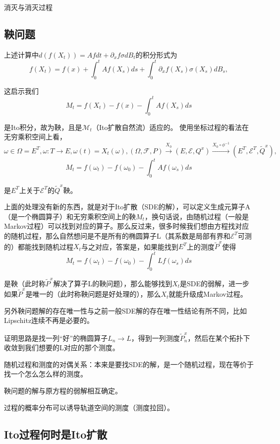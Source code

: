 消灭与消灭过程

\subsection{鞅问题}

上述计算中$d(f(X_t)) = Af dt + \partial_x f \sigma dB_t$的积分形式为
\[
  f(X_t) = f(x) + \int_0^t Af(X_s) ds + \int_0^t \partial_x f(X_s) \sigma(X_s) dB_s,
\]

这启示我们
\[
  M_t = f(X_t) - f(x) - \int_0^t Af(X_s) ds
\]

是Ito积分，故为鞅，且是$\mathcal{M}_t$（Ito扩散自然流）适应的。
使用坐标过程的看法在无穷乘积空间上看，$\omega \in \Omega = E^T, \omega: T \to E, \omega(t) = X_t(\omega), (\Omega, \mathcal{F}, P) \overset{X_0}{\to} (E, \mathcal{E}, Q^x) \overset{X_0 \circ \phi^{-1}}{\longrightarrow} (E^T, \mathcal{E}^T, \widetilde{Q}^x),$
\[
  M_t = f(\omega_t) - f(\omega_0) - \int_0^t Af(\omega_s) ds
\]

是$E^T$上关于$\mathcal{E}^T$的$\widetilde{Q}^x$鞅。

上面的处理没有新的东西，就是对于Ito扩散（SDE的解），可以定义生成元算子A（是一个椭圆算子）和无穷乘积空间上的鞅$M_t$，换句话说，由随机过程（一般是Markov过程）可以找到对应的算子。那么反过来，很多时候我们想由方程找对应的随机过程，那么自然想问是不是所有的椭圆算子L（其系数是局部有界和$\mathcal{E}^T$可测的）都能找到随机过程$X_t$与之对应，答案是，如果能找到$E^T$上的测度$\widetilde{P}^x$使得
\[
  M_t = f(\omega_t) - f(\omega_0) - \int_0^t Lf(\omega_s) ds
\]

是鞅（此时称$\widetilde{P}^x$解决了算子L的鞅问题），那么能够找到$X_t$是SDE的弱解，进一步如果$\widetilde{P}^x$是唯一的（此时称鞅问题是好处理的），那么$X_t$就能升级成Markov过程。

另外鞅问题解的存在唯一性与之前一般SDE解的存在唯一性结论有所不同，比如Lipschitz连续不再是必要的。

证明思路是找一列“好”的椭圆算子$L_n \to L$，得到一列测度$\widetilde{P}^x_n$，然后在某个拓扑下收敛到我们想要的L对应的那个测度。

随机过程和测度的对偶关系：本来是要找SDE的解，是一个随机过程，现在等价于找一个怎么怎么样的测度。

鞅问题的解与原方程的弱解相互确定。

过程的概率分布可以诱导轨道空间的测度（测度拉回）。

\subsection{Ito过程何时是Ito扩散}

